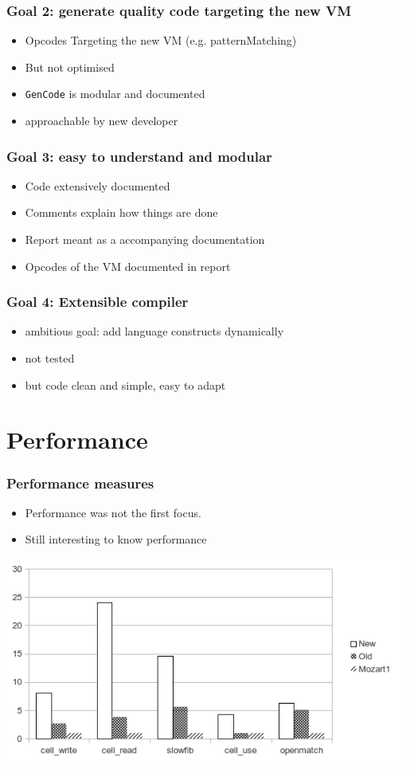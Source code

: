 \documentclass{beamer}
\begin{document}
\begin{frame}
\frametitle{Goal 2: generate quality code targeting the new VM}

\begin{itemize}
  \item Opcodes Targeting the new VM (e.g. patternMatching)
  \item But not optimised
  \item \lstinline!GenCode! is modular and documented
  \item approachable by new developer
\end{itemize}
\end{frame}


\begin{frame}
\frametitle{Goal 3: easy to understand and modular}
\begin{itemize}
  \item Code extensively documented
  \item Comments explain how things are done
  \item Report meant as a accompanying documentation
  \item Opcodes of the VM documented in report
\end{itemize}
\end{frame}


\begin{frame}
\frametitle{Goal 4: Extensible compiler}
\begin{itemize}
  \item ambitious goal: add language constructs dynamically
  \item not tested
  \item but code clean and simple, easy to adapt
\end{itemize}
\end{frame}

\section{Performance}

\begin{frame}
\frametitle{Performance measures}
\begin{itemize}
  \item Performance was not the first focus. 
  \item Still interesting to know performance
\end{itemize}

\includegraphics[scale=0.7]{../perfs/chart.png}
\end{frame}
\end{document}
